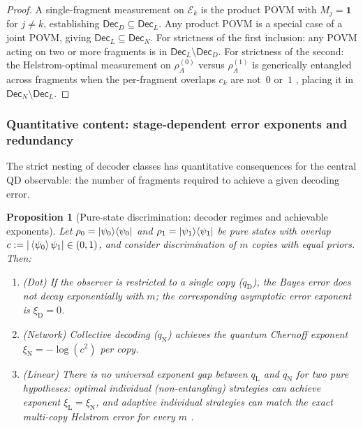 \documentclass[11pt]{article}
\newcommand{\cE}{\mathcal{E}}
\newcommand{\1}{\mathbf{1}}
\theoremstyle{definition}
\theoremstyle{plain}
\newtheorem{proposition}{Proposition}
\begin{document}
\begin{proof}
A single-fragment measurement on $\cE_k$ is the product POVM with
$M_j=\mathbf{1}$ for $j\neq k$, establishing
$\mathsf{Dec}_D\subseteq\mathsf{Dec}_L$.
Any product POVM is a special case of a joint POVM, giving
$\mathsf{Dec}_L\subseteq\mathsf{Dec}_N$.
For strictness of the first inclusion: any POVM acting on two or more
fragments is in $\mathsf{Dec}_L\setminus\mathsf{Dec}_D$.
For strictness of the second: the Helstrom-optimal measurement on
$\rho_A^{(0)}$ versus $\rho_A^{(1)}$ is generically entangled across
fragments when the per-fragment overlaps $c_k$ are not~$0$ or~$1$
\citep{Helstrom1976}, placing it in
$\mathsf{Dec}_N\setminus\mathsf{Dec}_L$.
\end{proof}


\subsubsection{Quantitative content: stage-dependent error exponents and redundancy}

The strict nesting of decoder classes has quantitative consequences for
the central QD observable: the number of fragments required to achieve a
given decoding error.

\begin{proposition}[Pure-state discrimination: decoder regimes and achievable exponents]
\label{prop:tight-gap}
Let $\rho_0=\ket{\psi_0}\!\bra{\psi_0}$ and $\rho_1=\ket{\psi_1}\!\bra{\psi_1}$ be pure states with overlap $c:=|\braket{\psi_0}{\psi_1}|\in(0,1)$, and consider discrimination of $m$ copies with equal priors.
Then:
\begin{enumerate}
\item (Dot) If the observer is restricted to a single copy ($q_{\mathrm{D}}$), the Bayes error does not decay exponentially with $m$; the corresponding asymptotic error exponent is $\xi_{\mathrm{D}}=0$.
\item (Network) Collective decoding ($q_{\mathrm{N}}$) achieves the quantum Chernoff exponent $\xi_{\mathrm{N}}=-\log(c^2)$ per copy.
\item (Linear) There is \emph{no universal exponent gap} between $q_{\mathrm{L}}$ and $q_{\mathrm{N}}$ for two pure hypotheses: optimal individual (non-entangling) strategies can achieve exponent $\xi_{\mathrm{L}}=\xi_{\mathrm{N}}$, and adaptive individual strategies can match the exact multi-copy Helstrom error for every $m$ \citep{AcinBaganBaigMasanesMunozTapia2005}.
\end{enumerate}
\end{proposition}
\end{document}
